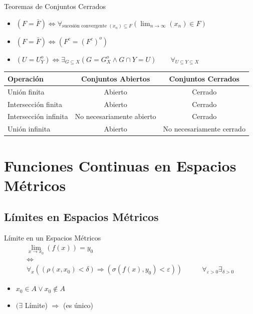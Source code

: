 \documentclass[a4paper,11pt]{article}
\begin{document}
\begin{definicion*}{Teoremas de Conjuntos Cerrados}{}
  \begin{itemize}
    \item $(F = \bar{F}) \Leftrightarrow \forall_{\text{sucesión convergente } (x_n) \subseteq F} \left( \lim_{n \to \infty} (x_n) \in F \right)$
    \item $(F = \bar{F}) \Leftrightarrow (F^c = (F^c)^o)$
    \item $(U = U_Y^o) \Leftrightarrow \exists_{G\subseteq X}(G = G_X^o \wedge G\cap Y = U) \qquad \forall_{U \subseteq Y \subseteq X} $
  \end{itemize}
  \begin{center}
  \begin{tabular}{l c c}
    \hline
    \textbf{Operación} & \textbf{Conjuntos Abiertos} & \textbf{Conjuntos Cerrados} \\
    \hline
    Unión finita & Abierto & Cerrado \\
    Intersección finita & Abierto & Cerrado \\
    Intersección infinita & No necesariamente abierto & Cerrado \\
    Unión infinita & Abierto & No necesariamente cerrado \\
    \hline
  \end{tabular}
  \end{center}
\end{definicion*}

\newpage

\section{Funciones Continuas en Espacios Métricos}

\subsection{Límites en Espacios Métricos}

\begin{definicion*}{Límite en un Espacios Métricos}{}
  \begin{equation*}
    \begin{array}{cc}
      \lim_{x \to x_0}(f(x)) = y_0 &\\
      \Leftrightarrow&\\
      \forall_x\left(( \rho(x, x_0) < \delta) \Rightarrow (\sigma(f(x),y_0) < \varepsilon) \right) &\qquad \forall_{\varepsilon > 0} \exists_{\delta > 0} 
    \end{array}
  \end{equation*}
  \begin{itemize}
    \item $x_0 \in A \vee x_0 \notin A$
    \item $(\exists$ Límite) $\Rightarrow$ (es único)
  \end{itemize}
\end{definicion*}
\end{document}
